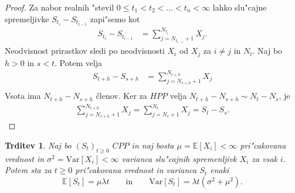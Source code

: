 \documentclass[12pt, a4paper, reqno]{amsart}
\theoremstyle{definition}
\theoremstyle{plain}
\newtheorem{trditev}[definicija]{Trditev}
\newcommand{\E}{\mathbb{E}}
\newcommand{\1}{\mathds{1}}
\newcommand{\Var}[1]{\text{Var}\left[#1\right]}
\begin{document}
        \begin{proof}
            Za nabor realnih "stevil $0 \leq t_1 < t_2 < \ldots < t_n < \infty$ lahko slu"cajne
            spremeljivke $S_{t_i} - S_{t_{i-1}}$ zapi"semo kot
            \begin{align*}
                S_{t_i} - S_{t_{i-1}} &= \sum_{j=N_{t_{i-1}}+1}^{N_{t_i}} X_j. 
            \end{align*}
            Neodvisnost prirastkov sledi po neodvisnosti $X_i$ od $X_j$ za $i\neq j$ in $N_t$. 
            Naj bo $h > 0$ in $s < t$. Potem velja
            \begin{align*}
                S_{t+h} - S_{s+h} &= \sum_{j=N_{s+h}+1}^{N_{t+h}} X_j \\
            \end{align*}
            Vsota ima $N_{t+h} - N_{s+h}$ členov. Ker za $HPP$ velja 
            $N_{t+h} - N_{s+h} \sim N_t - N_s$, je 
            \begin{align*}
                \sum_{j=N_{s+h}+1}^{N_{t+h}} X_j = \sum_{j=N_{s}+1}^{N_{t}} X_j = S_t - S_s.
            \end{align*}
        \end{proof}

        \begin{trditev}
            Naj bo $(S_t)_{t\geq 0}$ $CPP$ in naj bosta $\mu = \E\left[X_i\right] < \infty$ 
            pri"cakovana vrednost in $\sigma^2= \Var{X_i} <\infty$ varianca
            slu"cajnih spremenljivk $X_i$ za vsak $i$. Potem sta za $t\geq0$ pri"cakovana vrednost in 
            varianca $S_t$ enaki 
            \begin{equation*}
                \E\left[S_t\right] = \mu\lambda t \qquad \text{in} \qquad \Var{S_t} = \lambda t\left(\sigma^2 + \mu^2\right).
            \end{equation*}
            \label{trd:PricVarCPP}
        \end{trditev}
\end{document}
